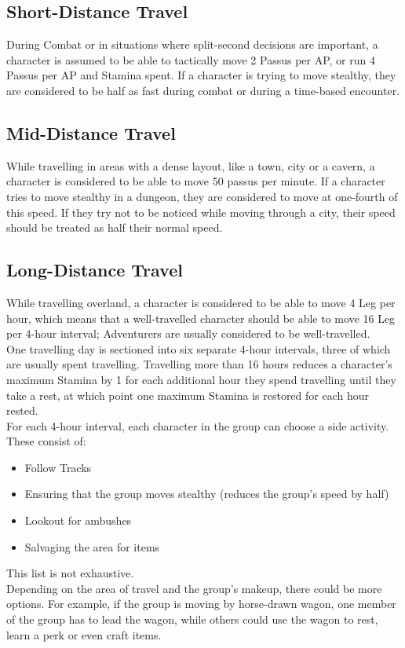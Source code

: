 \subsection{Short-Distance Travel}
During Combat or in situations where split-second decisions are important, a character is assumed to be able to tactically move 2 Passus per AP, or run 4 Passus per AP and Stamina spent. If a character is trying to move stealthy, they are considered to be half as fast during combat or during a time-based encounter.\\

\subsection{Mid-Distance Travel}
While travelling in areas with a dense layout, like a town, city or a cavern, a character is considered to be able to move 50 passus per minute. If a character tries to move stealthy in a dungeon, they are considered to move at one-fourth of this speed. If they try not to be noticed while moving through a city, their speed should be treated as half their normal speed.\\

\subsection{Long-Distance Travel}
While travelling overland, a character is considered to be able to move 4 Leg per hour, which means that a well-travelled character should be able to move 16 Leg per 4-hour interval; Adventurers are usually considered to be well-travelled.\\

One travelling day is sectioned into six separate 4-hour intervals, three of which are usually spent travelling. Travelling more than 16 hours reduces a character's maximum Stamina by 1 for each additional hour they spend travelling until they take a rest, at which point one maximum Stamina is restored for each hour rested.\\

For each 4-hour interval, each character in the group can choose a side activity. These consist of:
\begin{itemize}
	\item Follow Tracks
	
	\item Ensuring that the group moves stealthy (reduces the group's speed by half)
	
	\item Lookout for ambushes
	
	\item Salvaging the area for items
	
\end{itemize}
This list is not exhaustive.\\

Depending on the area of travel and the group's makeup, there could be more options. For example, if the group is moving by horse-drawn wagon, one member of the group has to lead the wagon, while others could use the wagon to rest, learn a perk or even craft items.
